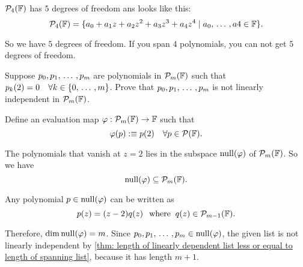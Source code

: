 \setcounter{xrcs}{15}
\begin{xrcs}
  $\mathcal{P}_4(\mathbb{F})$ has $5$ degrees of freedom ans looks like this:
  \[
    \mathcal{P}_4(\mathbb{F}) = \{a_0 + a_1 z + a_2z^2 + a_3 z^3 + a_4 z^4 \mid a_0, {\, \ldots \,\,}, a4 \in \mathbb{F} \}.
  \]

  So we have $5$ degrees of freedom. If you span $4$ polynomials, you can not get $5$ degrees of freedom.
\end{xrcs}

\setcounter{xrcs}{19}
\begin{xrcs}
  Suppose $p_0, p_1, {\, \ldots \,\,}, p_m$ are polynomials in $\mathcal{P}_m(\mathbb{F})$ such that $p_k(2) = 0 \quad \forall k \in \{0, {\, \ldots \,\,}, m\}$. Prove that $p_0, p_1, {\, \ldots \,\,}, p_m$ is not linearly independent in $\mathcal{P}_m(\mathbb{F})$.
\end{xrcs}
\begin{prf}
  Define an evaluation map $\varphi : \mathcal{P}_m(\mathbb{F}) \to \mathbb{F}$ such that
  \[
  \varphi(p) :\equiv p(2) \quad \forall p \in \mathcal{P}(\mathbb{F}).
  \]

  The polynomials that vanish at $z=2$ lies in the subspace $\operatorname{null}(\varphi)$ of $\mathcal{P}_m(\mathbb{F})$. So  we have
  \[
  \operatorname{null}(\varphi) \subseteq \mathcal{P}_m(\mathbb{F}).
  \]

  Any polynomial $p \in \operatorname{null}(\varphi)$ can be written as
  \[
  p(z) = (z-2) q(z) \;\;\, \text{where}\;\; q(z) \in \mathcal{P}_{m-1} (\mathbb{F}).
  \]

  Therefore, $\operatorname{dim} \operatorname{null}(\varphi) = m$. Since $p_0, p_1, {\, \ldots \,\,}, p_m \in \operatorname{null}(\varphi)$, the given list is not linearly independent by \ref{thm: length of linearly dependent list less or equal to length of spanning list}, because it has length $m+1$.
\end{prf}

